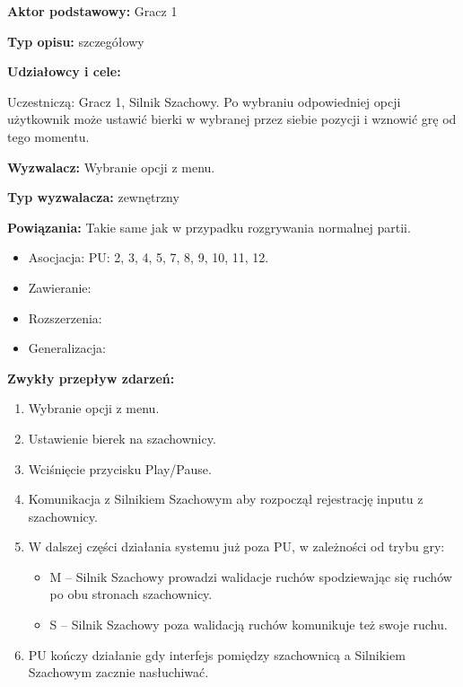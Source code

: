 \documentclass[12pt]{article}
\begin{document}
\textbf{Aktor podstawowy:} Gracz 1

\textbf{Typ opisu:} szczegółowy

\textbf{Udziałowcy i cele:} 

Uczestniczą: Gracz 1, Silnik Szachowy. Po wybraniu odpowiedniej opcji użytkownik może ustawić bierki w wybranej przez siebie pozycji i wznowić grę od tego momentu.

\textbf{Wyzwalacz:} Wybranie opcji z menu.

\textbf{Typ wyzwalacza:} zewnętrzny

\textbf{Powiązania:} Takie same jak w przypadku rozgrywania normalnej partii.
	\begin{itemize}\item Asocjacja: PU: 2, 3, 4, 5, 7, 8, 9, 10, 11, 12.
	\item Zawieranie: 
	\item Rozszerzenia:
	\item Generalizacja:
\end{itemize} 

\textbf{Zwykły przepływ zdarzeń:} 
\begin{enumerate}
\item Wybranie opcji z menu.
\item Ustawienie bierek na szachownicy.
\item Wciśnięcie przycisku Play/Pause.
\item Komunikacja z Silnikiem Szachowym aby rozpoczął rejestrację inputu z szachownicy.
\item W dalszej części działania systemu już poza PU, w zależności od trybu gry:
    \begin{itemize}
    \item M -- Silnik Szachowy prowadzi walidacje ruchów spodziewając się ruchów po obu stronach szachownicy.
    \item S -- Silnik Szachowy poza walidacją ruchów komunikuje też swoje ruchu.
    \end{itemize}
\item PU kończy działanie gdy interfejs pomiędzy szachownicą a Silnikiem Szachowym zacznie nasłuchiwać. 
\end{enumerate} 

\end{document}
